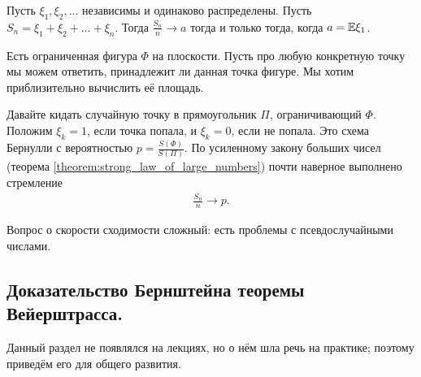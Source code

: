 \documentclass[../main.tex]{subfiles}
\begin{document}
\begin{thm}
 Пусть $ \xi_1, \xi_2, \ldots $  независимы и одинаково распределены. Пусть $ S_n  = \xi_1 + \xi_2 + \ldots + \xi_n $. Тогда $ \frac{S_n}{n} \to a $ тогда и только тогда, когда $ a = \mathbb E \xi_1 $.
\end{thm}

\begin{exmpl}
 Есть ограниченная фигура $ \Phi $ на плоскости. Пусть про любую конкретную точку мы можем ответить, принадлежит ли данная точка фигуре. Мы хотим приблизительно вычислить её площадь.

 Давайте кидать случайную точку в прямоугольник $ \Pi $, ограничивающий $ \Phi $. Положим $ \xi_k = 1 $, если точка попала, и $ \xi_k = 0 $, если не попала. Это схема Бернулли с вероятностью $ p = \frac{S(\Phi)}{S(\Pi)} $. По усиленному закону больших чисел (теорема \ref{theorem:strong_law_of_large_numbers}) почти наверное выполнено стремление
 \begin{align*}
  \frac{S_n}{n} \to p.
 \end{align*}

 Вопрос о скорости сходимости сложный: есть проблемы с псевдослучайными числами.
\end{exmpl}

\subsection{Доказательство Бернштейна теоремы Вейерштрасса.}

Данный раздел не появлялся на лекциях, но о нём шла речь на практике; поэтому приведём его для общего развития.
\end{document}

